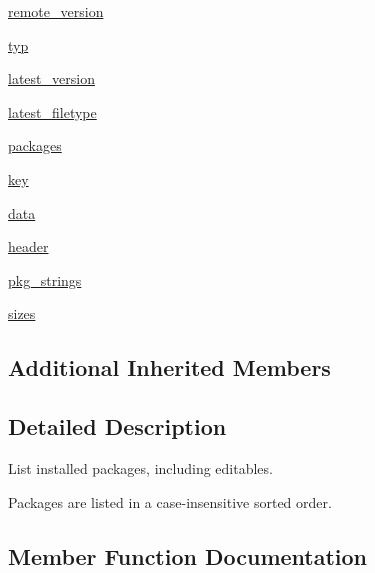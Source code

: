 \begin{DoxyCompactItemize}
\item 
\hyperlink{classpip_1_1__internal_1_1commands_1_1list_1_1ListCommand_a3e1460a3f060644ae5490e551e30a16a}{remote\+\_\+version}
\item 
\hyperlink{classpip_1_1__internal_1_1commands_1_1list_1_1ListCommand_aa87137336fd2dfc07e1546d44097d03c}{typ}
\item 
\hyperlink{classpip_1_1__internal_1_1commands_1_1list_1_1ListCommand_a9734c85f85972bdfe4fc91fec2c13cac}{latest\+\_\+version}
\item 
\hyperlink{classpip_1_1__internal_1_1commands_1_1list_1_1ListCommand_ae48ed29b37b7330e032e482e99533a3a}{latest\+\_\+filetype}
\item 
\hyperlink{classpip_1_1__internal_1_1commands_1_1list_1_1ListCommand_aa20f4d1aebc5052c8512e527a7fc277d}{packages}
\item 
\hyperlink{classpip_1_1__internal_1_1commands_1_1list_1_1ListCommand_afd98bb207831ac18cabcf254e20071e9}{key}
\item 
\hyperlink{classpip_1_1__internal_1_1commands_1_1list_1_1ListCommand_ab30bf9bdff395e0cac095164b5cb039f}{data}
\item 
\hyperlink{classpip_1_1__internal_1_1commands_1_1list_1_1ListCommand_a22d830c5914560137099bcb3c61ba560}{header}
\item 
\hyperlink{classpip_1_1__internal_1_1commands_1_1list_1_1ListCommand_ab593c996763dda976d2ef838cd77240c}{pkg\+\_\+strings}
\item 
\hyperlink{classpip_1_1__internal_1_1commands_1_1list_1_1ListCommand_a86f1bb5b7150bd0d29e4fb1bdea4a692}{sizes}
\end{DoxyCompactItemize}
\subsection*{Additional Inherited Members}


\subsection{Detailed Description}
\begin{DoxyVerb}List installed packages, including editables.

Packages are listed in a case-insensitive sorted order.
\end{DoxyVerb}
 

\subsection{Member Function Documentation}
\mbox{\label{classpip_1_1__internal_1_1commands_1_1list_1_1ListCommand_adfb0b7f6deaa1764ffa657a678922b2a}} 
